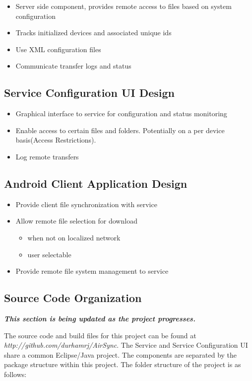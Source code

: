 \documentclass[12pt,draft]{article}
\begin{document}
\begin{itemize}
\item Server side component, provides remote access to files based on system configuration
\item Tracks initialized devices and associated unique ids
\item Use XML configuration files
\item Communicate transfer logs and status 
\end{itemize}

\subsection{Service Configuration UI Design}

\begin{itemize}
\item Graphical interface to service for configuration and status monitoring
\item Enable access to certain files and folders.  Potentially on a per device basis(Access Restrictions).
\item Log remote transfers
\end{itemize}

\subsection{Android Client Application Design}

\begin{itemize}
\item Provide client file synchronization with service
\item Allow remote file selection for download 
	\begin{itemize}
	\item when not on localized network
	\item user selectable
	\end {itemize}
\item Provide remote file system management to service
\end{itemize}

\subsection{Source Code Organization}
\begin{center}
\emph{\textbf{This section is being updated as the project progresses.}}\\
\end{center}
The source code and build files for this project can be found at \emph{http://github.com/durhamrj/AirSync}. The Service and Service Configuration UI share a common Eclipse/Java project. The components are separated by the package structure within this project. The  folder structure of the project is as follows:
\end{document}
